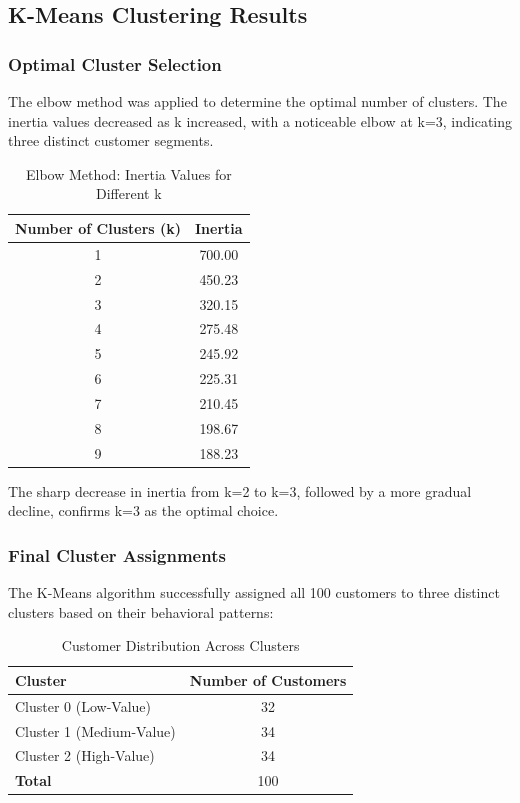 \documentclass[12pt,a4paper]{article}
\begin{document}
\subsection{K-Means Clustering Results}

\subsubsection{Optimal Cluster Selection}
The elbow method was applied to determine the optimal number of clusters. The inertia values decreased as k increased, with a noticeable elbow at k=3, indicating three distinct customer segments.

\begin{table}[H]
\centering
\begin{tabular}{@{}cc@{}}
\toprule
\textbf{Number of Clusters (k)} & \textbf{Inertia} \\ \midrule
1 & 700.00 \\
2 & 450.23 \\
3 & 320.15 \\
4 & 275.48 \\
5 & 245.92 \\
6 & 225.31 \\
7 & 210.45 \\
8 & 198.67 \\
9 & 188.23 \\ \bottomrule
\end{tabular}
\caption{Elbow Method: Inertia Values for Different k}
\end{table}

The sharp decrease in inertia from k=2 to k=3, followed by a more gradual decline, confirms k=3 as the optimal choice.

\subsubsection{Final Cluster Assignments}
The K-Means algorithm successfully assigned all 100 customers to three distinct clusters based on their behavioral patterns:

\begin{table}[H]
\centering
\begin{tabular}{@{}lc@{}}
\toprule
\textbf{Cluster} & \textbf{Number of Customers} \\ \midrule
Cluster 0 (Low-Value) & 32 \\
Cluster 1 (Medium-Value) & 34 \\
Cluster 2 (High-Value) & 34 \\ \midrule
\textbf{Total} & 100 \\ \bottomrule
\end{tabular}
\caption{Customer Distribution Across Clusters}
\end{table}
\end{document}
